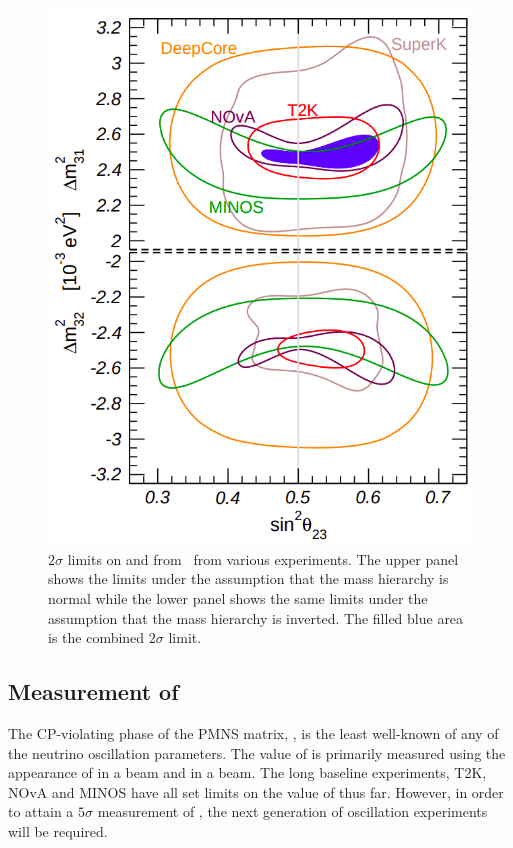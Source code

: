 \begin{figure}[h]
  \centering
  \includegraphics[width=.5\linewidth]{files/figures/theory/theta23Deltam}
  \caption[Experimental limits on  and .]{$2\sigma$ limits on  and  from~\cite{nufit4} from various experiments. The upper panel shows the limits under the assumption that the mass hierarchy is normal while the lower panel shows the same limits under the assumption that the mass hierarchy is inverted. The filled blue area is the combined $2\sigma$ limit.}
  \label{fig:theta23deltam}
\end{figure}

\subsection{Measurement of \dcp}
\label{sec:theory:currentState:dcp}

The CP-violating phase of the PMNS matrix, \dcp, is the least well-known of any of the neutrino oscillation parameters.
The value of \dcp is primarily measured using the appearance of \nue in a \numu beam and \anue in a \anumu beam.
The long baseline experiments, T2K, NOvA and MINOS have all set limits on the value of \dcp thus far.
However, in order to attain a $5\sigma$ measurement of \dcp, the next generation of oscillation experiments will be required.
